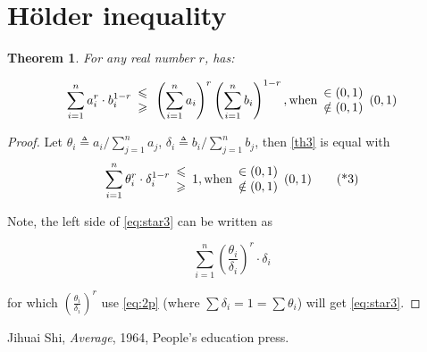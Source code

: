 \documentclass[12pt,a4paper,reqno]{amsart}
\theoremstyle{plain}
\newtheorem{Th}{Theorem}
\theoremstyle{definition}
\begin{document}
\section{H\"older inequality}

\begin{Th} \label{th3} 
  For any real number $r$, has: 
 
  \begin{equation}
    \sum^n_{i=1} a_i^r\cdot b_i^{1-r} 
      \begin{array}{c}
        \leqslant \\ 
        \geqslant  
      \end{array}
    \left (\sum_{i=1}^n a_i \right)^r  
    \left (\sum_{i=1}^n b_i \right)^{1-r}, \textnormal{when} 
    \begin{array}{l}
    \in (0,1) \\  
    \notin(0, 1)     
    \end{array}
    (0, 1)
  \end{equation}

\end{Th}

\begin{proof}
Let $\theta_i\triangleq a_i/\sum_{j=1}^n a_j$, $\delta_i\triangleq b_i/\sum_{j=1}^n b_j$, then \eqref{th3} is equal with 
\begin{equation}\label{eq:star3}
  \sum^n_{i=1} \theta_i^r\cdot \delta_i^{1-r} 
      \begin{array}{c}
        \leqslant \\ 
        \geqslant  
      \end{array} 
    1, \textnormal{when} 
    \begin{array}{l}
    \in (0,1) \\  
    \notin(0, 1)     
    \end{array}
    (0, 1) \tag{*3}
\end{equation}

Note, the left side of \eqref{eq:star3} can be written as 

$$\sum_{i=1}^n \left( \frac{\theta_i}{\delta_i} \right)^r \cdot \delta_i $$ 

for which $\left( \frac{\theta_i}{\delta_i} \right)^r$ use \eqref{eq:2p} (where $\sum\delta_i = 1 = \sum\theta_i$) will get \eqref{eq:star3}. 
\end{proof}




\begin{thebibliography}{99} 

 Jihuai Shi, \textit{Average}, 1964, People's education press.  


\end{thebibliography}
\end{document}
